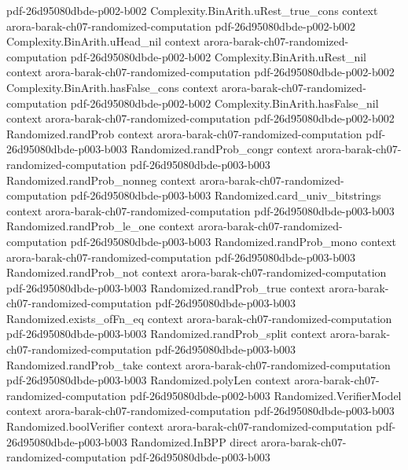 \begin{theorem}
  {pdf-26d95080dbde-p002-b002}
\proofstep
  {Complexity.BinArith.uRest_true_cons}
  {context}
  {arora-barak-ch07-randomized-computation}
  {pdf-26d95080dbde-p002-b002}
\proofstep
  {Complexity.BinArith.uHead_nil}
  {context}
  {arora-barak-ch07-randomized-computation}
  {pdf-26d95080dbde-p002-b002}
\proofstep
  {Complexity.BinArith.uRest_nil}
  {context}
  {arora-barak-ch07-randomized-computation}
  {pdf-26d95080dbde-p002-b002}
\proofstep
  {Complexity.BinArith.hasFalse_cons}
  {context}
  {arora-barak-ch07-randomized-computation}
  {pdf-26d95080dbde-p002-b002}
\proofstep
  {Complexity.BinArith.hasFalse_nil}
  {context}
  {arora-barak-ch07-randomized-computation}
  {pdf-26d95080dbde-p002-b002}
\proofstep
  {Randomized.randProb}
  {context}
  {arora-barak-ch07-randomized-computation}
  {pdf-26d95080dbde-p003-b003}
\proofstep
  {Randomized.randProb_congr}
  {context}
  {arora-barak-ch07-randomized-computation}
  {pdf-26d95080dbde-p003-b003}
\proofstep
  {Randomized.randProb_nonneg}
  {context}
  {arora-barak-ch07-randomized-computation}
  {pdf-26d95080dbde-p003-b003}
\proofstep
  {Randomized.card_univ_bitstrings}
  {context}
  {arora-barak-ch07-randomized-computation}
  {pdf-26d95080dbde-p003-b003}
\proofstep
  {Randomized.randProb_le_one}
  {context}
  {arora-barak-ch07-randomized-computation}
  {pdf-26d95080dbde-p003-b003}
\proofstep
  {Randomized.randProb_mono}
  {context}
  {arora-barak-ch07-randomized-computation}
  {pdf-26d95080dbde-p003-b003}
\proofstep
  {Randomized.randProb_not}
  {context}
  {arora-barak-ch07-randomized-computation}
  {pdf-26d95080dbde-p003-b003}
\proofstep
  {Randomized.randProb_true}
  {context}
  {arora-barak-ch07-randomized-computation}
  {pdf-26d95080dbde-p003-b003}
\proofstep
  {Randomized.exists_ofFn_eq}
  {context}
  {arora-barak-ch07-randomized-computation}
  {pdf-26d95080dbde-p003-b003}
\proofstep
  {Randomized.randProb_split}
  {context}
  {arora-barak-ch07-randomized-computation}
  {pdf-26d95080dbde-p003-b003}
\proofstep
  {Randomized.randProb_take}
  {context}
  {arora-barak-ch07-randomized-computation}
  {pdf-26d95080dbde-p003-b003}
\proofstep
  {Randomized.polyLen}
  {context}
  {arora-barak-ch07-randomized-computation}
  {pdf-26d95080dbde-p002-b003}
\proofstep
  {Randomized.VerifierModel}
  {context}
  {arora-barak-ch07-randomized-computation}
  {pdf-26d95080dbde-p003-b003}
\proofstep
  {Randomized.boolVerifier}
  {context}
  {arora-barak-ch07-randomized-computation}
  {pdf-26d95080dbde-p003-b003}
\proofstep
  {Randomized.InBPP}
  {direct}
  {arora-barak-ch07-randomized-computation}
  {pdf-26d95080dbde-p003-b003}

\end{theorem}
